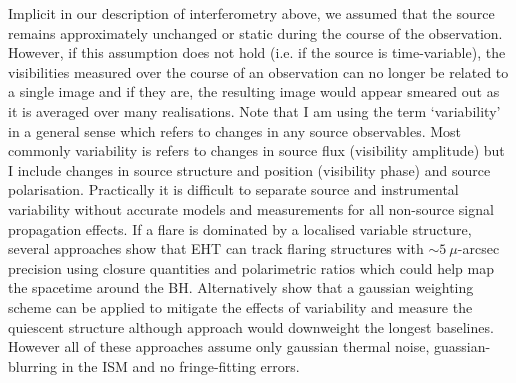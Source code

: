 Implicit in our description of interferometry above, we assumed that the source remains approximately unchanged or static during the course of the observation. However, if this assumption does not hold (i.e. if the source is time-variable),  the visibilities measured over the course of an observation can no longer be related to a single image and if they are, the resulting image would appear smeared out as it is averaged over many realisations. 
Note that I am using the term `variability' in a general sense which refers to changes in any source observables. Most commonly variability is refers to changes in source flux (visibility amplitude) but I include changes in source structure and position (visibility phase) and source polarisation. Practically it is difficult to separate source and instrumental variability without accurate models and measurements for all non-source signal propagation effects. 
If a flare is dominated by a localised variable structure, several approaches \citep{Doeleman_2009, Fish_2009b, Johnson_2014} show that EHT can track flaring structures with $\sim 5\ \mu$-arcsec precision using closure quantities and polarimetric ratios which could help map the spacetime around the BH. Alternatively \citet{Lu_2016} show that a gaussian weighting scheme can be applied to mitigate the effects of variability and measure the quiescent structure although approach would downweight the longest baselines. However all of these approaches assume only gaussian thermal noise, guassian-blurring in the ISM and no fringe-fitting errors.
